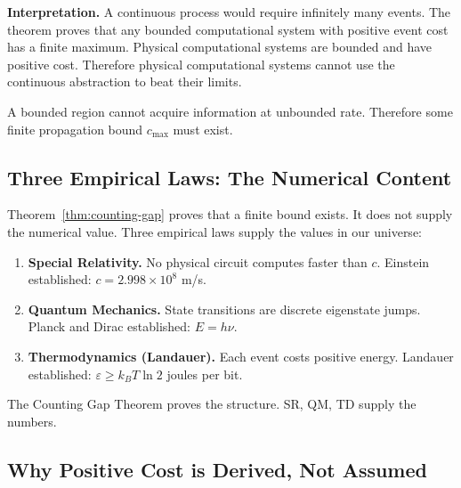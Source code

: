 \noindent\textbf{Interpretation.} A continuous process would require infinitely many events. The theorem proves that any bounded computational system with positive event cost has a finite maximum. Physical computational systems are bounded and have positive cost. Therefore physical computational systems cannot use the continuous abstraction to beat their limits.

\begin{corollary}\label{cor:forced-finite-speed}
A bounded region cannot acquire information at unbounded rate. Therefore some finite propagation bound $c_{\max}$ must exist.
\end{corollary}

\subsection{Three Empirical Laws: The Numerical Content}\label{sec:three-laws}

Theorem~\ref{thm:counting-gap} proves that a finite bound exists. It does not supply the numerical value. Three empirical laws supply the values in our universe:

\begin{enumerate}
\item[\textbf{SR.}] \textbf{Special Relativity.}
  No physical circuit computes faster than $c$.
  Einstein established: $c = 2.998 \times 10^8$ m/s.
  \cite{einstein1905electrodynamics,minkowski1908space}

\item[\textbf{QM.}] \textbf{Quantum Mechanics.}
  State transitions are discrete eigenstate jumps.
  Planck and Dirac established: $E = h\nu$.
  \cite{planck1901distribution,dirac1930principles}

\item[\textbf{TD.}] \textbf{Thermodynamics (Landauer).}
  Each event costs positive energy.
  Landauer established: $\varepsilon \geq k_B T \ln 2$ joules per bit.
  \cite{landauer1961irreversibility,bennett1982thermodynamics,berut2012experimental}
\end{enumerate}

\noindent The Counting Gap Theorem proves the structure. SR, QM, TD supply the numbers.

\subsection{Why Positive Cost is Derived, Not Assumed}\label{sec:positive-cost-derived}

